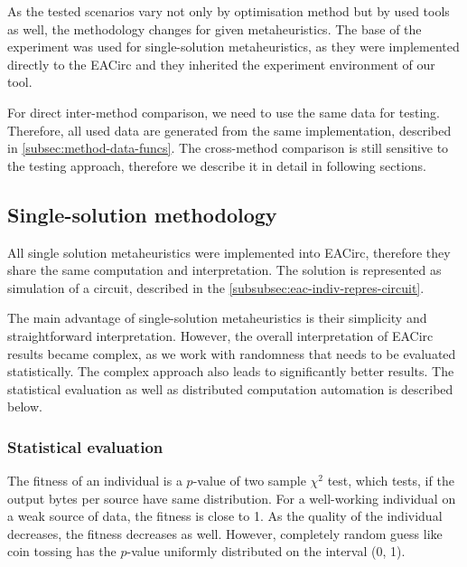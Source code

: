 \documentclass[
  print, %
  Table,   %
  nolof,     %
  nolot,     %
  11pt, %
  oneside  %
]{fithesis3}
\begin{document}
As the tested scenarios vary not only by optimisation method but by used tools as well, the methodology changes for given metaheuristics. The base of the experiment was used for single-solution metaheuristics, as they were implemented directly to the EACirc and they inherited the experiment environment of our tool.

For direct inter-method comparison, we need to use the same data for testing. Therefore, all used data are generated from the same implementation, described in \cref{subsec:method-data-funcs}. The cross-method comparison is still sensitive to the testing approach, therefore we describe it in detail in following sections.


\subsection{Single-solution methodology}
\label{subsec:method-spec-ss}

All single solution metaheuristics were implemented into EACirc, therefore they share the same computation and interpretation. The solution is represented as simulation of a circuit, described in the \cref{subsubsec:eac-indiv-repres-circuit}.

The main advantage of single-solution metaheuristics is their simplicity and straightforward interpretation. However, the overall interpretation of EACirc results became complex, as we work with randomness that needs to be evaluated statistically. The complex approach also leads to significantly better results. The statistical evaluation as well as distributed computation automation is described below.


\subsubsection{\textbf{Statistical evaluation}}
\label{subsubsec:method-spec-ss-stat}

The fitness of an individual is a $p$-value of two sample $\chi^{2}$ test, which tests, if the output bytes per source have same distribution. For a well-working individual on a weak source of data, the fitness is close to 1. As the quality of the individual decreases, the fitness decreases as well. However, completely random guess like coin tossing has the $p$-value uniformly distributed on the interval (0, 1).
\end{document}
